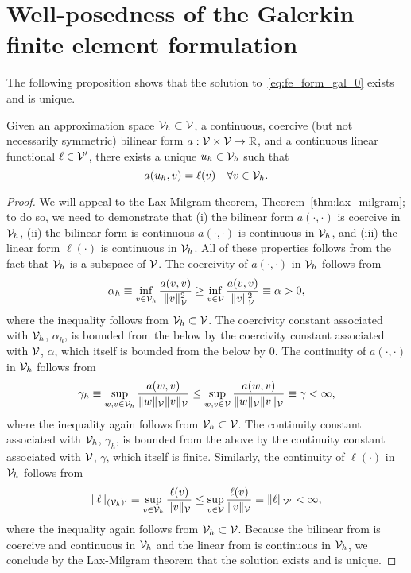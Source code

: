\section{Well-posedness of the Galerkin finite element formulation}
\label{sec:fe_form_gal_wellposed}
The following proposition shows that the solution to~\eqref{eq:fe_form_gal_0} exists and is unique.
\begin{proposition}
  \label{prop:fe_form_gal_wellposed}
    Given an approximation space $\mathcal{V}_h \subset \mathcal{V}$, a continuous, coercive (but not necessarily symmetric) bilinear form $a: \mathcal{V} \times \mathcal{V} \to \mathbb{R}$, and a continuous linear functional $\ell \in \mathcal{V}'$, there exists a unique $u_h \in \mathcal{V}_h$ such that
  \begin{equation*}
    a(u_h,v) = \ell(v) \quad \forall v \in \mathcal{V}_h.
  \end{equation*}
  \begin{proof}
We will appeal to the Lax-Milgram theorem, Theorem~\ref{thm:lax_milgram}; to do so, we need to demonstrate that (i) the bilinear form $a(\cdot,\cdot)$ is coercive in $\mathcal{V}_h$, (ii) the bilinear form is continuous $a(\cdot,\cdot)$ is continuous in $\mathcal{V}_h$, and (iii) the linear form $\ell(\cdot)$ is continuous in $\mathcal{V}_h$.  All of these properties follows from the fact that $\mathcal{V}_h$ is a subspace of $\mathcal{V}$.  The coercivity of $a(\cdot,\cdot)$ in $\mathcal{V}_h$ follows from
\begin{equation*}
  \alpha_h \equiv \inf_{v \in \mathcal{V}_h} \frac{a(v,v)}{\| v \|^2_{\mathcal{V}}} \geq
  \inf_{v \in \mathcal{V}} \frac{a(v,v)}{\| v \|^2_{\mathcal{V}}} \equiv \alpha > 0,
\end{equation*}
where the inequality follows from $\mathcal{V}_h \subset \mathcal{V}$.  The coercivity constant associated with $\mathcal{V}_h$, $\alpha_h$, is bounded from the below by the coercivity constant associated with $\mathcal{V}$, $\alpha$, which itself is bounded from the below by $0$. The continuity of $a(\cdot,\cdot)$ in $\mathcal{V}_h$ follows from
\begin{equation*}
  \gamma_h \equiv \sup_{w,v \in \mathcal{V}_h} \frac{a(w,v)}{\|w\|_{\mathcal{V}}\| v \|_{\mathcal{V}}} \leq
  \sup_{w,v \in \mathcal{V}} \frac{a(w,v)}{\| w \|_{\mathcal{V}}\| v \|_{\mathcal{V}}} \equiv \gamma < \infty,
\end{equation*}
where the inequality again follows from $\mathcal{V}_h \subset \mathcal{V}$.  The continuity constant associated with $\mathcal{V}_h$, $\gamma_h$, is bounded from the above by the continuity constant associated with $\mathcal{V}$, $\gamma$, which itself is finite.  Similarly, the continuity of $\ell(\cdot)$ in $\mathcal{V}_h$ follows from
\begin{equation*}
  \| \ell \|_{(\mathcal{V}_h)'} \equiv \sup_{v \in \mathcal{V}_h} \frac{\ell(v)}{\| v \|_{\mathcal{V}}} \leq \sup_{v \in \mathcal{V}} \frac{\ell(v)}{\| v \|_{\mathcal{V}}} \equiv \| \ell \|_{\mathcal{V}'} < \infty,
\end{equation*}
where the inequality again follows from $\mathcal{V}_h \subset \mathcal{V}$.  Because the bilinear from is coercive and continuous in $\mathcal{V}_h$ and the linear from is continuous in $\mathcal{V}_h$, we conclude by the Lax-Milgram theorem that the solution exists and is unique.
  \end{proof}
\end{proposition}

